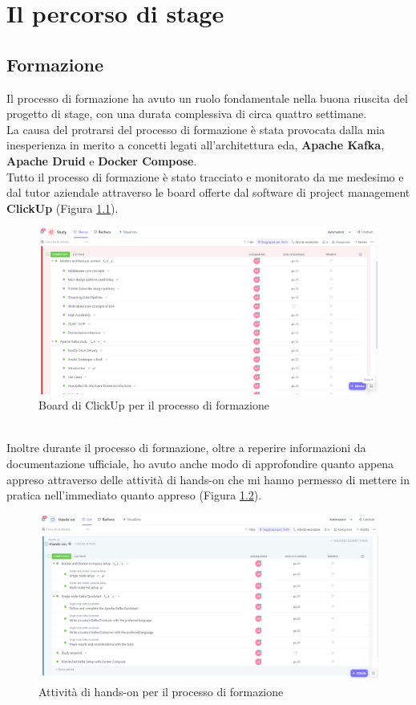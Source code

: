 \chapter{Il percorso di stage }\label{cap:Il_percorso}
\section{Formazione}
Il processo di formazione ha avuto un ruolo fondamentale nella buona riuscita del progetto di stage, con una durata complessiva di circa quattro settimane. \\
La causa del protrarsi del processo di formazione è stata provocata dalla mia inesperienza in merito a 
concetti legati all'architettura \gls{eda}{},
\textbf{Apache Kafka}, \textbf{Apache Druid} e \textbf{Docker Compose}.\\  
Tutto il processo di formazione è stato tracciato e monitorato da me medesimo e dal tutor aziendale attraverso le \gls{board}{} offerte 
dal software di \gls{project management}{} \textbf{ClickUp} (Figura \ref{cap:ClickUp}).\\
\begin{figure}[h]
    \centering
    \includegraphics[width=1\textwidth]{images/percorso/formazione.png}
    \caption{Board di ClickUp per il processo di formazione}
    \label{cap:ClickUp}
\end{figure}
\pagebreak
\\
Inoltre durante il processo di formazione, oltre a reperire informazioni da documentazione ufficiale, ho avuto anche modo 
di approfondire quanto appena appreso attraverso delle attività di \gls{hands-on}{} che mi hanno permesso di mettere in pratica nell'immediato quanto appreso
(Figura \ref{cap:Hands-on}).
\begin{figure}[h]
    \centering
    \includegraphics[width=1\textwidth]{images/percorso/hands_on.png}
    \caption{Attività di hands-on per il processo di formazione}
    \label{cap:Hands-on}
\end{figure}

